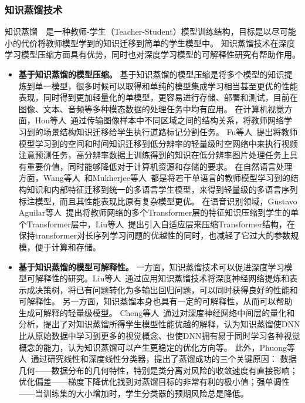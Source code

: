 \subsubsection{知识蒸馏技术}

知识蒸馏~~是一种教师-学生（Teacher-Student）模型训练结构，目标是以尽可能小的代价将教师模型学到的知识迁移到简单的学生模型中。
知识蒸馏技术在深度学习模型压缩方面具有优势，同时也对深度学习模型的可解释性研究有帮助作用。

\begin{itemize}
	\item \textbf{基于知识蒸馏的模型压缩。}
	      基于知识蒸馏的模型压缩是将多个模型的知识提炼到单一模型，很多时候可以取得和单纯的模型集成学习相当甚至更优的性能表现，同时得到更加轻量化的单模型，更容易进行存储、部署和测试，目前在图像、文本、音频等多种模态数据的处理任务中均有应用。
	      在计算机视觉方面，Hou等人~通过传输图像样本中不同区域之间的结构关系，将教师网络学习到的场景结构知识迁移给学生执行道路标记分割任务。
	      Fu等人~提出将教师模型学习到的空间和时间知识迁移到低分辨率的轻量级时空网络中来执行视频注意预测任务，高分辨率数据上训练得到的知识在低分辨率图片处理任务上具有重要价值，同时能够降低对于计算机资源和存储的要求。
	      在自然语言处理方面，Wang等人~和Mukherjee等人~都是将若干单语言的教师模型学习到的结构知识和内部特征迁移到统一的多语言学生模型，来得到轻量级的多语言序列标注模型，而且其性能表现比原有复杂模型更优。
	      在语音识别领域，Gustavo Aguilar等人~提出将教师网络的多个Transformer层的特征知识压缩到学生的单个Transformer层中，Liu等人~提出引入自适应层来压缩Transformer结构，在保持transformer对长序列学习问题的优越性的同时，也减轻了它过大的参数规模，便于计算和存储。

	\item \textbf{基于知识蒸馏的模型可解释性。}
	      一方面，知识蒸馏技术可以促进深度学习模型可解释性的研究。Liu等人~通过应用知识蒸馏技术将深度神经网络提炼和表示成决策树，将已有问题转化为多输出回归问题，可以同时获得良好的性能和可解释性。
	      另一方面，知识蒸馏本身也具有一定的可解释性，从而可以帮助生成可解释的轻量级模型。
	      Cheng等人~通过对深度神经网络中间层的量化和分析，提出了对知识蒸馏所得学生模型性能优越的解释，认为知识蒸馏使DNN比从原始数据中学习到更多的视觉概念、也使DNN拥有易于同时学习各种视觉概念的能力，认为知识蒸馏可以产生更稳定的优化方向等。
	      此外，Phuong等人~通过研究线性和深度线性分类器，提出了蒸馏成功的三个关键原因： 数据几何——数据分布的几何特性，特别是类分离对风险的收敛速度有直接影响；优化偏差——梯度下降优化找到对蒸馏目标的非常有利的极小值；强单调性——当训练集的大小增加时，学生分类器的预期风险总是降低。
\end{itemize}

